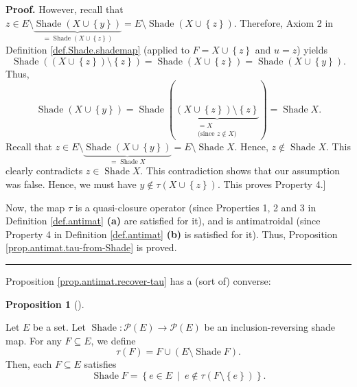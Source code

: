 \documentclass[numbers=enddot,12pt,final,onecolumn]{scrartcl}%
\theoremstyle{definition}
\newtheorem{prop}[theo]{Proposition}
\newenvironment{proposition}[1][]
{\begin{prop}[#1]\begin{leftbar}}
{\end{leftbar}\end{prop}}
\newenvironment{proof}[1][Proof]{\noindent\textbf{#1.} }{\ \rule{0.5em}{0.5em}}
\newenvironment{verlong}{}{}
\begin{document}
\begin{verlong}
\begin{proof}
However, recall that $z\in E\setminus\underbrace{\operatorname*{Shade}\left(
X\cup\left\{  y\right\}  \right)  }_{=\operatorname*{Shade}\left(
X\cup\left\{  z\right\}  \right)  }=E\setminus\operatorname*{Shade}\left(
X\cup\left\{  z\right\}  \right)  $. Therefore, Axiom 2 in Definition
\ref{def.Shade.shademap} (applied to $F=X\cup\left\{  z\right\}  $ and $u=z$)
yields%
\[
\operatorname*{Shade}\left(  \left(  X\cup\left\{  z\right\}  \right)
\setminus\left\{  z\right\}  \right)  =\operatorname*{Shade}\left(
X\cup\left\{  z\right\}  \right)  =\operatorname*{Shade}\left(  X\cup\left\{
y\right\}  \right)  .
\]
Thus,%
\[
\operatorname*{Shade}\left(  X\cup\left\{  y\right\}  \right)
=\operatorname*{Shade}\left(  \underbrace{\left(  X\cup\left\{  z\right\}
\right)  \setminus\left\{  z\right\}  }_{\substack{=X\\\text{(since }z\notin
X\text{)}}}\right)  =\operatorname*{Shade}X.
\]
Recall that $z\in E\setminus\underbrace{\operatorname*{Shade}\left(
X\cup\left\{  y\right\}  \right)  }_{=\operatorname*{Shade}X}=E\setminus
\operatorname*{Shade}X$. Hence, $z\notin\operatorname*{Shade}X$. This clearly
contradicts $z\in\operatorname*{Shade}X$. This contradiction shows that our
assumption was false. Hence, we must have $y\notin\tau\left(  X\cup\left\{
z\right\}  \right)  $. This proves Property 4.]

Now, the map $\tau$ is a quasi-closure operator (since Properties 1, 2 and 3
in Definition \ref{def.antimat} \textbf{(a)} are satisfied for it), and is
antimatroidal (since Property 4 in Definition \ref{def.antimat} \textbf{(b)}
is satisfied for it). Thus, Proposition \ref{prop.antimat.tau-from-Shade} is proved.
\end{proof}
\end{verlong}

Proposition \ref{prop.antimat.recover-tau} has a (sort of) converse:

\begin{proposition}
\label{prop.antimat.recover-Shade}Let $E$ be a set. Let $\operatorname*{Shade}%
:\mathcal{P}\left(  E\right)  \rightarrow\mathcal{P}\left(  E\right)  $ be an
inclusion-reversing shade map. For any $F\subseteq E$, we define%
\[
\tau\left(  F\right)  =F\cup\left(  E\setminus\operatorname*{Shade}F\right)
.
\]
Then, each $F\subseteq E$ satisfies%
\begin{equation}
\operatorname*{Shade}F=\left\{  e\in E\ \mid\ e\notin\tau\left(
F\setminus\left\{  e\right\}  \right)  \right\}  .
\label{eq.prop.antimat.recover-Shade.ShadeF=}%
\end{equation}

\end{proposition}
\end{document}

